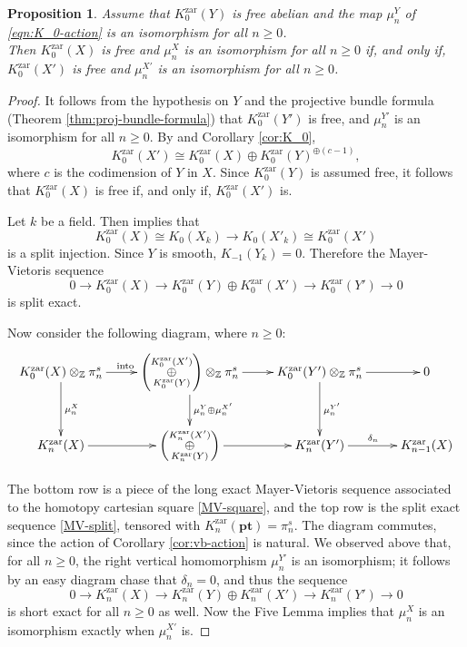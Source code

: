 \documentclass[12pt]{amsart}
\def\Kzar{K^{\mathrm{zar}}}
\newcommand{\Z}{\mathbb{Z}}
\newcommand{\pt}{\mathbf{pt}}
\numberwithin{equation}{section}
\theoremstyle{plain}
\newtheorem{prop}[equation]{Proposition}
\theoremstyle{definition}
\theoremstyle{remark}
\begin{document}
\begin{prop}\label{prop:single-blow-up}
  Assume that $\Kzar_0(Y)$ is free abelian and the map $\mu^Y_n$
  of \eqref{eqn:K_0-action} is an isomorphism for all $n\geq 0$. \\
  Then $\Kzar_0(X)$ is free and $\mu^X_n$ is an isomorphism for all
  $n\geq 0$ if, and only if, $\Kzar_0(X')$ is free and
  $\mu^{X'}_n$ is an isomorphism for all $n\geq 0$. 
\end{prop}

\begin{proof}
It follows from the hypothesis on $Y$ and the projective bundle
formula (Theorem \ref{thm:proj-bundle-formula}) that
$\Kzar_0(Y')$ is free, and
$\mu^{Y'}_n$ is an isomorphism for all $n\geq 0$.
By \cite[Thm.\,2.1]{T} and Corollary \ref{cor:K_0},
\[\Kzar_0(X')\cong \Kzar_0(X)\oplus \Kzar_0(Y)^{\oplus (c-1)},\]
where $c$ is the codimension of $Y$ in $X$.
Since $\Kzar_0(Y)$ is assumed free, it follows that
$\Kzar_0(X)$ is free if, and only if, $\Kzar_0(X')$ is. 
	
Let $k$ be a field. Then \cite[Lem.\,2.3]{T} implies that 
\[\Kzar_0(X)\cong K_0(X_k)\to K_0(X'_k)\cong \Kzar_0(X')\]
is a split injection. Since $Y$ is smooth, $K_{-1}(Y_k) = 0$.
Therefore the Mayer-Vietoris sequence
\begin{equation}\label{MV-split} 
0\to \Kzar_0(X)\to \Kzar_0(Y)\oplus \Kzar_0(X')\to \Kzar_0(Y')\to 0 
\end{equation}
is split exact. 
	
Now consider the following diagram, where $n\geq 0$:
\begin{equation*}\xymatrix{
\Kzar_0(X)\otimes_\Z \pi^s_n \ar[d]^{\mu^X_n} \ar[r]^{\mathrm{into}}&
\left(\underset{\Kzar_0(Y)}{\overset{\Kzar_0(X')}{\oplus}}\right)
\otimes_\Z \pi^s_n \ar[d]^{\mu^Y_n\oplus\mu^{X'}_n} \ar[r]& \Kzar_0(Y')\otimes_\Z\pi^s_n \ar[d]^{\mu^{Y'}_n} \ar[r]& 0
			\\
\Kzar_n(X) \ar[r]& \left(\underset{\Kzar_n(Y)}{\overset{\Kzar_n(X')}{\oplus}}\right) \ar[r]&\Kzar_n(Y') \ar[r]^{\delta_n}& \Kzar_{n-1}(X) 
}
\end{equation*}

The bottom row is a piece of the long exact Mayer-Vietoris sequence
associated to the homotopy cartesian square \eqref{MV-square},
and the top row is the split exact sequence \eqref{MV-split},
tensored with $\Kzar_n(\pt) = \pi^s_n$.
The diagram commutes, since the action of Corollary \ref{cor:vb-action}
is natural. We observed above that, for all $n\geq 0$,
the right vertical homomorphism $\mu^{Y'}_n$ is an isomorphism; it follows by an easy diagram chase that $\delta_n = 0$, and thus the sequence
\[
  0\to \Kzar_n(X)\to \Kzar_n(Y)\oplus \Kzar_n(X')\to \Kzar_n(Y')\to 0
\]
is short exact for all $n\geq 0$ as well.
Now the Five Lemma implies that $\mu_n^X$ is an isomorphism
exactly when
$\mu_n^{X'}$ is. 
\end{proof}
	
\end{document}
